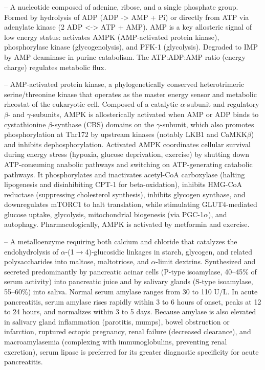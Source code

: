 -- A nucleotide composed of adenine, ribose, and a single phosphate group. Formed by hydrolysis of ADP (ADP -> AMP + Pi) or directly from ATP via adenylate kinase (2 ADP <-> ATP + AMP). AMP is a key allosteric signal of low energy status: activates AMPK (AMP-activated protein kinase), phosphorylase kinase (glycogenolysis), and PFK-1 (glycolysis). Degraded to IMP by AMP deaminase in purine catabolism. The ATP:ADP:AMP ratio (energy charge) regulates metabolic flux.

-- AMP-activated protein kinase, a phylogenetically conserved heterotrimeric serine/threonine kinase that operates as the master energy sensor and metabolic rheostat of the eukaryotic cell. Composed of a catalytic $\alpha$-subunit and regulatory $\beta$- and $\gamma$-subunits, AMPK is allosterically activated when AMP or ADP binds to cystathionine $\beta$-synthase (CBS) domains on the $\gamma$-subunit, which also promotes phosphorylation at Thr172 by upstream kinases (notably LKB1 and CaMKK$\beta$) and inhibits dephosphorylation. Activated AMPK coordinates cellular survival during energy stress (hypoxia, glucose deprivation, exercise) by shutting down ATP-consuming anabolic pathways and switching on ATP-generating catabolic pathways. It phosphorylates and inactivates acetyl-CoA carboxylase (halting lipogenesis and disinhibiting CPT-1 for beta-oxidation), inhibits HMG-CoA reductase (suppressing cholesterol synthesis), inhibits glycogen synthase, and downregulates mTORC1 to halt translation, while stimulating GLUT4-mediated glucose uptake, glycolysis, mitochondrial biogenesis (via PGC-1$\alpha$), and autophagy. Pharmacologically, AMPK is activated by metformin and exercise.

-- A metalloenzyme requiring both calcium and chloride that catalyzes the endohydrolysis of $\alpha$-(1$\to$4)-glucosidic linkages in starch, glycogen, and related polysaccharides into maltose, maltotriose, and $\alpha$-limit dextrins. Synthesized and secreted predominantly by pancreatic acinar cells (P-type isoamylase, 40--45\% of serum activity) into pancreatic juice and by salivary glands (S-type isoamylase, 55--60\%) into saliva. Normal serum amylase ranges from 30 to 110 U/L. In acute pancreatitis, serum amylase rises rapidly within 3 to 6 hours of onset, peaks at 12 to 24 hours, and normalizes within 3 to 5 days. Because amylase is also elevated in salivary gland inflammation (parotitis, mumps), bowel obstruction or infarction, ruptured ectopic pregnancy, renal failure (decreased clearance), and macroamylasemia (complexing with immunoglobulins, preventing renal excretion), serum lipase is preferred for its greater diagnostic specificity for acute pancreatitis.

